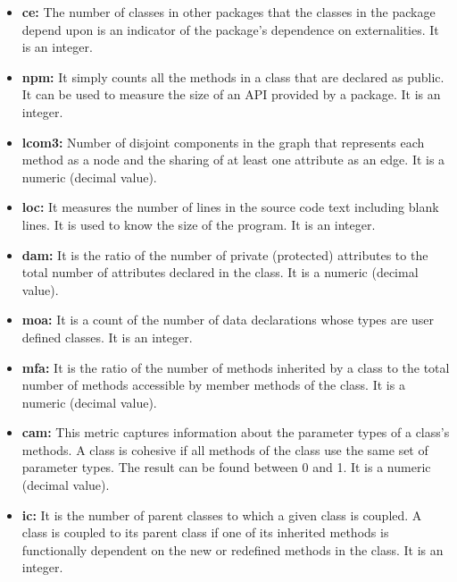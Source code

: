 \begin{itemize}
\begin{itemize}
        \item \textbf{\acrshort{ce}:} The number of classes in other packages that the classes in the package depend upon is an indicator of the package's dependence on externalities. It is an integer.
        
        \item \textbf{\acrshort{npm}:} It simply counts all the methods in a class that are declared as public. It can be used to measure the size of an API provided by a package. It is an integer.
        
        \item \textbf{\acrshort{lcom3}:} Number of disjoint components in the graph that represents each method as a node and the sharing of at least one attribute as an edge. It is a numeric (decimal value).
        
        \item \textbf{\acrshort{loc}:} It measures the number of lines in the source code text including blank lines. It is used to know the size of the program. It is an integer.
        
        \item \textbf{\acrshort{dam}:} It is the ratio of the number of private (protected) attributes to the total number of attributes declared in the class. It is a numeric (decimal value).
        
        \item \textbf{\acrshort{moa}:} It is a count of the number of data declarations whose types are user defined classes. It is an integer.
        
        \item \textbf{\acrshort{mfa}:} It is the ratio of the number of methods inherited by a class to the total number of methods accessible by member methods of the class. It is a numeric (decimal value).
        
        \item \textbf{\acrshort{cam}:} This metric captures information about the parameter types of a class's methods. A class is cohesive if all methods of the class use the same set of parameter types. The result can be found between 0 and 1. It is a numeric (decimal value).
        
        \item \textbf{\acrshort{ic}:} It is the number of parent classes to which a given class is coupled. A class is coupled to its parent class if one of its inherited methods is functionally dependent on the new or redefined methods in the class. It is an integer.
        

\end{itemize}
\end{itemize}
